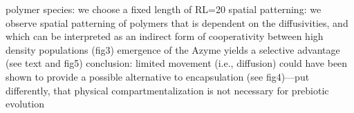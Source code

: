 \markdownRendererUlItem polymer species: we choose a fixed length of RL=20\markdownRendererUlItemEnd 
\markdownRendererUlItem spatial patterning: we observe spatial patterning of polymers that is dependent on the diffusivities, and which can be interpreted as an indirect form of cooperativity between high density populations (fig3)\markdownRendererUlItemEnd 
\markdownRendererUlItem emergence of the Azyme yields a selective advantage (see text and fig5)\markdownRendererUlItemEnd 
\markdownRendererUlItem conclusion: limited movement (i.e., diffusion) could have been shown to provide a possible alternative to encapsulation (see fig4)—put differently, that physical compartmentalization is not necessary for prebiotic evolution\markdownRendererUlItemEnd 
\markdownRendererUlEnd \markdownRendererDocumentEnd